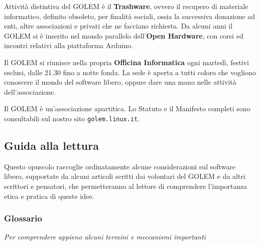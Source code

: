 \documentclass[a4paper, 12pt]{extarticle}
\begin{document}
Attività distintiva del GOLEM è il \textbf{Trashware}, ovvero il
recupero di materiale informatico, definito obsoleto, per finalità
sociali, ossia la successiva donazione ad enti, altre associazioni e
privati che ne facciano richiesta. Da alcuni anni il GOLEM si è
inserito nel mondo parallelo dell'\textbf{Open Hardware}, con corsi ed
incontri relativi alla piattaforma Arduino.

Il GOLEM si riunisce nella propria \textbf{Officina Informatica} ogni
martedì, festivi esclusi, dalle 21.30 fino a notte fonda. La sede è
aperta a tutti coloro che vogliono conoscere il mondo del software
libero, oppure dare una mano nelle attività dell'associazione.

Il GOLEM è un'associazione apartitica. Lo Statuto e il Manifesto
completi sono consultabili sul nostro sito \texttt{golem.linux.it}.

\clearpage

\subsection*{Guida alla lettura}

Questo opuscolo raccoglie ordinatamente alcune considerazioni sul
software libero, supportate da alcuni articoli scritti dai volontari
del GOLEM e da altri scrittori e pensatori, che permetteranno al lettore
di comprendere l'importanza etica e pratica di queste idee.

\subsubsection*{Glossario}
\textit{Per comprendere appieno alcuni termini e meccanismi importanti}
\end{document}
